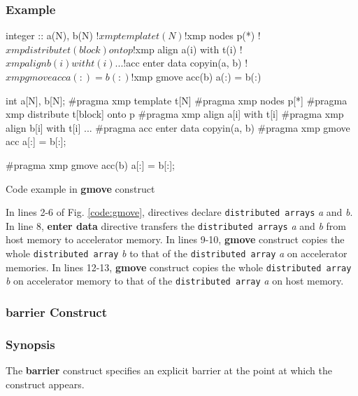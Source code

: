 \subsubsection*{Example}
\begin{myfigure}
\begin{minipage}{0.45\hsize}
\begin{center}
\begin{XACCFexampleL}
integer :: a(N), b(N)
!$xmp template t(N)
!$xmp nodes p(*)
!$xmp distribute t(block) onto p
!$xmp align a(i) with t(i)
!$xmp align b(i) with t(i)
...
!$acc enter data copyin(a, b)
!$xmp gmove acc
  a(:) = b(:)

!$xmp gmove acc(b)
  a(:) = b(:)
\end{XACCFexampleL}
\end{center}
\end{minipage}
%
\begin{minipage}{0.53\hsize}
\begin{center}
\begin{XACCCexampleR}
int a[N], b[N];
#pragma xmp template t[N]
#pragma xmp nodes p[*]
#pragma xmp distribute t[block] onto p
#pragma xmp align a[i] with t[i]
#pragma xmp align b[i] with t[i]
...
#pragma acc enter data copyin(a, b)
#pragma xmp gmove acc
  a[:] = b[:];

#pragma xmp gmove acc(b)
  a[:] = b[:];
\end{XACCCexampleR}
\end{center}
\end{minipage}
\caption{Code example in {\XACC} {\bf gmove} construct}\label{code:gmove}
\end{myfigure}

In lines 2-6 of Fig. \ref{code:gmove},
{\XMP} directives declare {\tt distributed arrays} {\it a} and {\it b}.
In line 8,
{\OACC} {\bf enter data} directive transfers the {\tt distributed arrays} {\it a} and {\it b} from host memory to accelerator memory.
In lines 9-10,
{\XACC} {\bf gmove} construct copies the whole {\tt distributed array} {\it b} to
that of the {\tt distributed array} {\it a} on accelerator memories.
In lines 12-13,
{\XACC} {\bf gmove} construct copies the whole {\tt distributed array} {\it b} on accelerator memory to
that of the {\tt distributed array} {\it a} on host memory.

\subsubsection{barrier Construct}\label{sec:barrier}
\subsubsection*{Synopsis}
The {\bf barrier} construct specifies an explicit barrier
at the point at which the construct appears.

